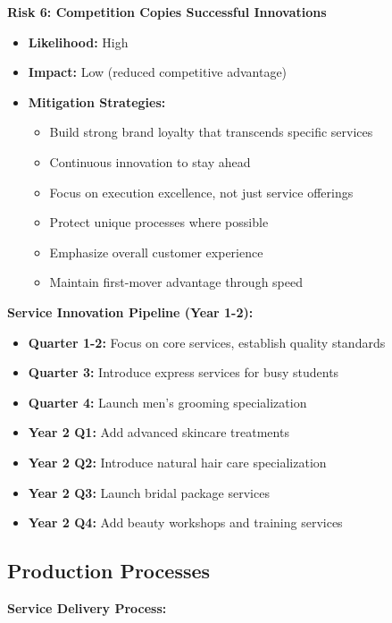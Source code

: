 \documentclass[a4paper,12pt]{article}
\begin{document}
\textbf{Risk 6: Competition Copies Successful Innovations}
\begin{itemize}[leftmargin=2em]
    \item \textbf{Likelihood:} High
    \item \textbf{Impact:} Low (reduced competitive advantage)
    \item \textbf{Mitigation Strategies:}
    \begin{itemize}
        \item Build strong brand loyalty that transcends specific services
        \item Continuous innovation to stay ahead
        \item Focus on execution excellence, not just service offerings
        \item Protect unique processes where possible
        \item Emphasize overall customer experience
        \item Maintain first-mover advantage through speed
    \end{itemize}
\end{itemize}

\vspace{1em}

\textbf{Service Innovation Pipeline (Year 1-2):}
\begin{itemize}[leftmargin=2em]
    \item \textbf{Quarter 1-2:} Focus on core services, establish quality standards
    \item \textbf{Quarter 3:} Introduce express services for busy students
    \item \textbf{Quarter 4:} Launch men's grooming specialization
    \item \textbf{Year 2 Q1:} Add advanced skincare treatments
    \item \textbf{Year 2 Q2:} Introduce natural hair care specialization
    \item \textbf{Year 2 Q3:} Launch bridal package services
    \item \textbf{Year 2 Q4:} Add beauty workshops and training services
\end{itemize}

\subsection{Production Processes}

\textbf{Service Delivery Process:}
\end{document}
